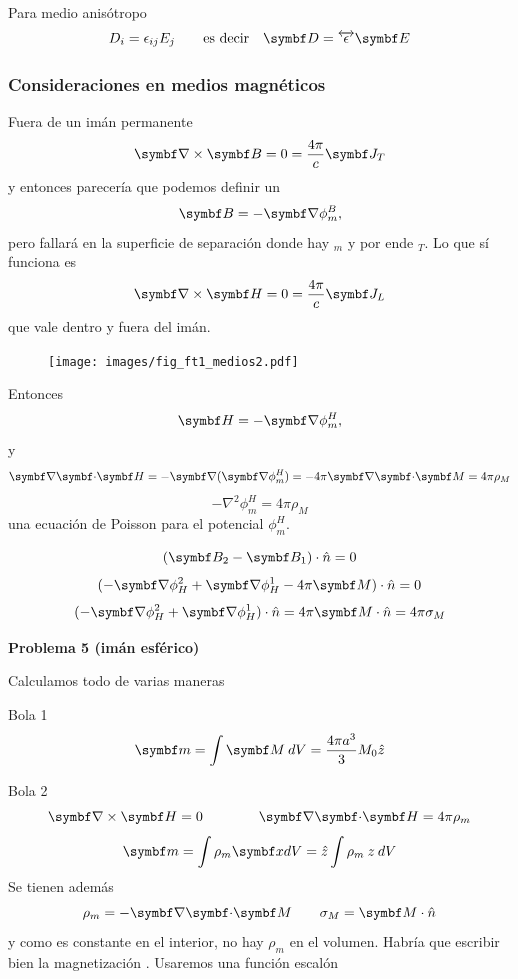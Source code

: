 \documentclass[10pt,oneside]{CBFT_book}
\begin{document}
Para medio anisótropo
\[
	D_i = \epsilon_{ij} E_j \qquad \text{es decir} \quad \vb{D} = \overleftrightarrow{\epsilon} \vb{E}
\]

\subsubsection{Consideraciones en medios magnéticos}

Fuera de un imán permanente 
\[
	\rotorm{B} = 0 = \frac{4\pi}{c}\vb{J}_T
\]
y entonces parecería que podemos definir un
\[
	\vb{B} = -\Nabla \phi_m^B,
\]
pero fallará en la superficie de separación donde hay $_m$ y por ende $_T$. Lo que sí funciona
es
\[
	\rotorm{H} = 0 = \frac{4\pi}{c}\vb{J}_L
\]
que vale dentro y fuera del imán.
\begin{figure}[htb]
	\begin{center}
	\texttt{[image: images/fig\_ft1\_medios2.pdf]}	 
	\end{center}
	\caption{}
\end{figure}

Entonces
\[
	\vb{H} = -\Nabla \phi_m^H,
\]
y
\[
	\divem{H} = -\Nabla(\Nabla \phi^H_m ) = -4\pi \divem{M} = 4\pi\rho_M
\]
\[
	-\nabla^2 \phi_m^H = 4\pi\rho_M
\]
una ecuación de Poisson para el potencial $\phi_m^H$.

\[
	(\vb{B}_2 - \vb{B}_1)\cdot\hat{n} = 0
\]
\[
	(-\Nabla \phi^2_H + \Nabla \phi^1_H - 4\pi \vb{M})\cdot\hat{n} = 0
\]
\[
	(-\Nabla \phi^2_H + \Nabla \phi^1_H )\cdot\hat{n} = 4\pi \vb{M}\cdot\hat{n} = 4\pi \sigma_M
\]

\begin{ejemplo}{\bf Problema 5 (imán esférico)}

Calculamos todo de varias maneras


Bola \textcircled{1}
\[
	\vb{m} = \int \vb{M} \: dV = \frac{4 \pi a^3 }{3} M_0 \hat{z}
\]

Bola \textcircled{2}
\[
	\rotorm{H} = 0 \qquad \qquad \divem{H} = 4 \pi \rho_m
\]
\[
	\vb{m} = \int \rho_m \vbx dV = \hat{z} \int \rho_m \: z \: dV
\]
Se tienen además
\[
	\rho_m = - \divem{M} \qquad \sigma_M = \vb{M}\cdot{\hat{n}}
\]
y como  es constante en el interior, no hay $\rho_m$ en el volumen.
Habría que escribir bien la magnetización .
Usaremos una función escalón



 
\end{ejemplo}
\end{document}
